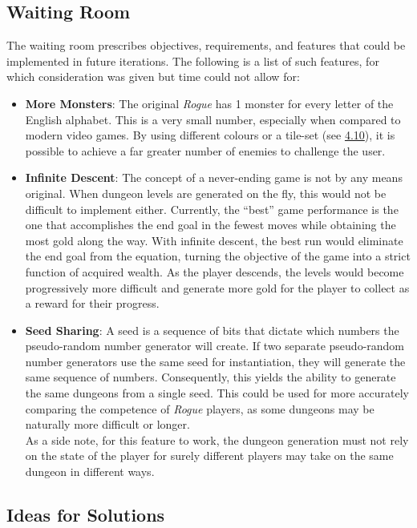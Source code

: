 \documentclass[12pt, titlepage]{article}
\begin{document}
	\subsection{Waiting Room}
		The waiting room prescribes objectives, requirements, and features that could be implemented in future iterations. The following is a list of such features, for which consideration was given but time could not allow for:
		\begin{itemize}
			\item \textbf{More Monsters}: The original \textit{Rogue} has 1 monster for every letter of the English alphabet.  This is a very small number, especially when compared to modern video games.  By using different colours or a tile-set (see \hyperref[IdeasForSolutions]{4.10}), it is possible to achieve a far greater number of enemies to challenge the user.

			\item \textbf{Infinite Descent}: The concept of a never-ending game is not by any means original.  When dungeon levels are generated on the fly, this would not be difficult to implement either.  Currently, the ``best'' game performance is the one that accomplishes the end goal in the fewest moves while obtaining the most gold along the way. With infinite descent, the best run would eliminate the end goal from the equation, turning the objective of the game into a strict function of acquired wealth.  As the player descends, the levels would become progressively more difficult and generate more gold for the player to collect as a reward for their progress.

			\item \textbf{Seed Sharing}:  A seed is a sequence of bits that dictate which numbers the pseudo-random number generator will create.  If two separate pseudo-random number generators use the same seed for instantiation, they will generate the same sequence of numbers.  Consequently, this yields the ability to generate the same dungeons from a single seed.  This could be used for more accurately comparing the competence of \textit{Rogue} players, as some dungeons may be naturally more difficult or longer.\\

			As a side note, for this feature to work, the dungeon generation must not rely on the state of the player for surely different players may take on the same dungeon in different ways.
		\end{itemize}

	\subsection{Ideas for Solutions}
	\label{ideasForSolutions}
\end{document}

